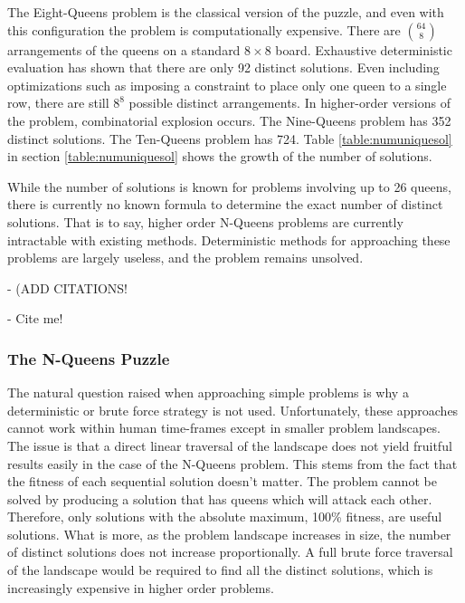 \documentclass{sig-alternate}
\begin{document}
The Eight-Queens problem is the classical version of the puzzle, and even with this configuration the problem is computationally expensive. There are {$64 \choose 8$} arrangements of the queens on a standard {$8\times{}8$} board. Exhaustive deterministic evaluation has shown that there are only 92 distinct solutions. Even including optimizations such as imposing a constraint to place only one queen to a single row, there are still {$8^8$} possible distinct arrangements. In higher-order versions of the problem, combinatorial explosion occurs. The Nine-Queens problem has 352 distinct solutions. The Ten-Queens problem has 724. Table \ref{table:numuniquesol} in section \ref{table:numuniquesol} shows the growth of the number of solutions. 

While the number of solutions is known for problems involving up to 26 queens, there is currently no known formula to determine the exact number of distinct solutions. That is to say, higher order N-Queens problems are currently intractable with existing methods. Deterministic methods for approaching these problems are largely useless, and the problem remains unsolved.

- (ADD CITATIONS!
  
- Cite me!\cite{crawford1992solving,homaifar1992e1,andrews2006investigation,tuson1998adapting, wolpert1997no,srinivas1994adaptive,goldberg1988genetic}

\subsubsection{The N-Queens Puzzle}
The natural question raised when approaching simple problems is why a deterministic or brute force strategy is not used. Unfortunately, these approaches cannot work within human time-frames except in smaller problem landscapes. The issue is that a direct linear traversal of the landscape does not yield fruitful results easily in the case of the N-Queens problem. This stems from the fact that the fitness of each sequential solution doesn't matter. The problem cannot be solved by producing a solution that has queens which will attack each other. Therefore, only solutions with the absolute maximum, 100\% fitness, are useful solutions. What is more, as the problem landscape increases in size, the number of distinct solutions does not increase proportionally. A full brute force traversal of the landscape would be required to find all the distinct solutions, which is increasingly expensive in higher order problems.
\end{document}
